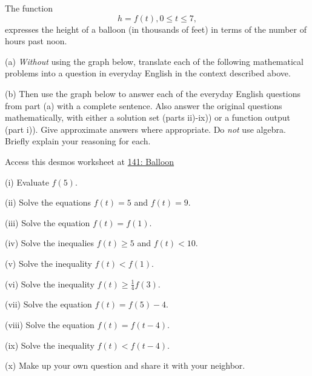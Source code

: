 \documentclass{ximera}
\begin{document}
\begin{example}  \label{Ex:er0445}
The function
\[
    h = f(t) , 0\leq t \leq 7 ,
\]
expresses the height of a balloon (in thousands of feet) in terms of the number of hours past noon.

(a) \emph{Without} using the graph below, translate each of the following mathematical problems into a question in everyday English in  the context described above.

(b) Then use the graph below to answer each of the everyday English questions from part (a) with a complete sentence. Also answer the original questions mathematically, with either a solution set (parts ii)-ix)) or a function output (part i)). Give approximate answers where appropriate. Do \emph{not} use algebra. Briefly explain your reasoning for each.



 
\begin{onlineOnly}
    \begin{center}
\end{center}
\end{onlineOnly}

Access this desmos worksheet at \href{https://www.desmos.com/calculator/ddrjntgogr}{141: Balloon}


(i) Evaluate $f(5)$.

(ii) Solve the equations $f(t)=5$ and $f(t)=9$.

(iii) Solve the equation $f(t)=f(1)$.

(iv) Solve the inequalies $f(t)\geq 5$ and $f(t)<10$.

(v) Solve the inequality $f(t)< f(1)$.

(vi) Solve the inequality $f(t)\geq \frac{1}{4}f(3)$.

(vii) Solve the equation $f(t)=f(5) - 4$.

(viii) Solve the equation $f(t)=f(t-4)$.

(ix) Solve the inequality $f(t)<f(t-4)$.

(x) Make up your own question and share it with your neighbor.

\end{example}
\end{document}
